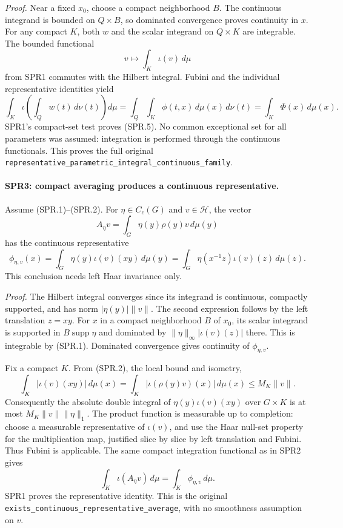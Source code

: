 \emph{Proof.}
Near a fixed \(x_0\), choose a compact neighborhood \(B\).
The continuous integrand is bounded on \(Q\times B\), so dominated
convergence proves continuity in \(x\).
For any compact \(K\), both \(w\) and the scalar integrand on
\(Q\times K\) are integrable.  The bounded functional
\[
 v\longmapsto\int_K\iota(v)\,d\mu
\]
from SPR1 commutes with the Hilbert integral.  Fubini and the
individual representative identities yield
\[
 \int_K\iota\!\left(\int_Q w(t)\,d\nu(t)\right)d\mu
 =\int_Q\int_K\phi(t,x)\,d\mu(x)\,d\nu(t)
 =\int_K\Phi(x)\,d\mu(x).
\]
SPR1's compact-set test proves (SPR.5).
No common exceptional set for all parameters was assumed:
integration is performed through the continuous functionals.
This proves the full original
\texttt{representative\_\allowbreak parametric\_\allowbreak integral\_\allowbreak continuous\_\allowbreak family}.

\paragraph{SPR3: compact averaging produces a continuous representative.}
\label{claim:SPR3}
Assume (SPR.1)--(SPR.2).  For \(\eta\in C_c(G)\) and \(v\in\mathcal H\),
the vector
\[
 A_\eta v=\int_G\eta(y)\rho(y)v\,d\mu(y)
\]
has the continuous representative
\[
 \phi_{\eta,v}(x)
   =\int_G\eta(y)\iota(v)(xy)\,d\mu(y)
   =\int_G\eta(x^{-1}z)\iota(v)(z)\,d\mu(z).
 \tag{SPR.6}
\]
This conclusion needs left Haar invariance only.

\emph{Proof.}
The Hilbert integral converges since its integrand is continuous,
compactly supported, and has norm \(|\eta(y)|\|v\|\).
The second expression follows by the left translation \(z=xy\).
For \(x\) in a compact neighborhood \(B\) of \(x_0\), its scalar
integrand is supported in \(B\operatorname{supp}\eta\) and dominated
by
\(\|\eta\|_\infty|\iota(v)(z)|\) there.
This is integrable by (SPR.1).  Dominated convergence gives
continuity of \(\phi_{\eta,v}\).

Fix a compact \(K\).  From (SPR.2), the local bound and isometry,
\[
 \int_K|\iota(v)(xy)|\,d\mu(x)
 =\int_K|\iota(\rho(y)v)(x)|\,d\mu(x)
 \le M_K\|v\|.
\]
Consequently the absolute double integral of
\(\eta(y)\iota(v)(xy)\) over \(G\times K\) is at most
\(M_K\|v\|\|\eta\|_1\).
The product function is measurable up to completion: choose a
measurable representative of \(\iota(v)\), and use the Haar
null-set property for the multiplication map, justified slice by
slice by left translation and Fubini.
Thus Fubini is applicable.  The same compact integration
functional as in SPR2 gives
\[
 \int_K\iota(A_\eta v)\,d\mu=\int_K\phi_{\eta,v}\,d\mu.
\]
SPR1 proves the representative identity.
This is the original
\texttt{exists\_\allowbreak continuous\_\allowbreak representative\_\allowbreak average}, with no
smoothness assumption on \(v\).


